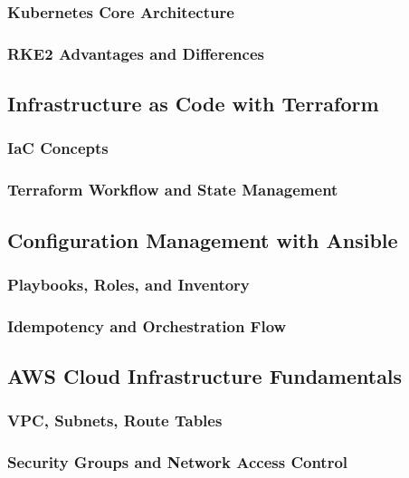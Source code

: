 \documentclass[12pt]{article}
\begin{document}
\subsubsection{Kubernetes Core Architecture}
\subsubsection{RKE2 Advantages and Differences}

\subsection{Infrastructure as Code with Terraform}
\subsubsection{IaC Concepts}
\subsubsection{Terraform Workflow and State Management}

\subsection{Configuration Management with Ansible}
\subsubsection{Playbooks, Roles, and Inventory}
\subsubsection{Idempotency and Orchestration Flow}

\subsection{AWS Cloud Infrastructure Fundamentals}
\subsubsection{VPC, Subnets, Route Tables}
\subsubsection{Security Groups and Network Access Control}

\end{document}
